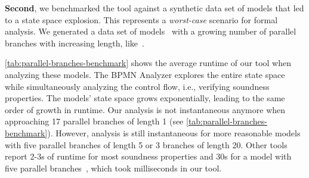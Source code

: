 \documentclass[onecolumn]{ceurart}
\begin{document}
\textbf{Second}, we benchmarked the tool against a synthetic data set of models that led to a state space explosion.
This represents a \textit{worst-case} scenario for formal analysis.
We generated a data set of models~\cite{krauterInstantaneousComprehensibleFixable2024} with a growing number of parallel branches with increasing length, like~\cite{corradiniFormalApproachAnalysis2021}.

\autoref{tab:parallel-branches-benchmark} shows the average runtime of our tool when analyzing these models.
The BPMN Analyzer explores the entire state space while simultaneously analyzing the control flow, i.e., verifying soundness properties.
The models' state space grows exponentially, leading to the same order of growth in runtime.
Our analysis is not instantaneous anymore when approaching 17 parallel branches of length 1 (see \autoref{tab:parallel-branches-benchmark}).
However, analysis is still instantaneous for more reasonable models with five parallel branches of length 5 or 3 branches of length 20.
Other tools report 2-3s of runtime for most soundness properties and 30s for a model with five parallel branches~\cite{corradiniFormalApproachAnalysis2021}, which took milliseconds in our tool.
\end{document}
